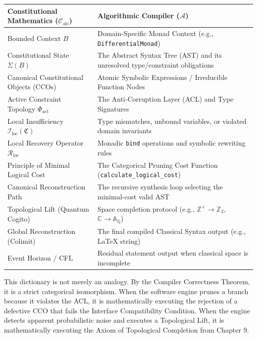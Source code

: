 \documentclass[12pt,openany]{extbook}
\theoremstyle{plain}
\theoremstyle{definition}
\begin{document}
\vspace{\intextsep}
\noindent
\begin{nopagebreak}
\renewcommand{\arraystretch}{1.5}
\begin{tabular}{p{} p{}}
\hline
\textbf{Constitutional Mathematics ($\mathcal{C}_{\mathrm{alc}}$)} & \textbf{Algorithmic Compiler ($\mathcal{A}$)} \\
\hline
Bounded Context $B$ & Domain-Specific Monad Context (e.g., \texttt{DifferentialMonad}) \\
\hline
Constitutional State $\Sigma(B)$ & The Abstract Syntax Tree (AST) and its unresolved type/constraint obligations \\
\hline
Canonical Constitutional Objects (CCOs) & Atomic Symbolic Expressions / Irreducible Function Nodes \\
\hline
Active Constraint Topology $\Phi_{\mathrm{act}}$ & The Anti-Corruption Layer (ACL) and Type Signatures \\
\hline
Local Insufficiency $\mathcal{I}_{\mathrm{loc}}(\mathfrak{C})$ & Type mismatches, unbound variables, or violated domain invariants \\
\hline
Local Recovery Operator $\mathcal{R}_{\mathrm{loc}}$ & Monadic \texttt{bind} operations and symbolic rewriting rules \\
\hline
Principle of Minimal Logical Cost & The Categorical Pruning Cost Function (\texttt{calculate\_logical\_cost}) \\
\hline
Canonical Reconstruction Path & The recursive synthesis loop selecting the minimal-cost valid AST \\
\hline
Topological Lift (Quantum Cogito) & Space completion protocol (e.g., $\mathbb{Z}^+ \to \mathbb{Z}_2$, $\mathbb{C} \to \mathbb{A}_{\mathbb{Q}}$) \\
\hline
Global Reconstruction (Colimit) & The final compiled Classical Syntax output (e.g., \LaTeX{} string) \\
\hline
Event Horizon / CFL & Residual statement output when classical space is incomplete \\
\hline
\end{tabular}
\end{nopagebreak}
\vspace{\intextsep}

This dictionary is not merely an analogy. By the Compiler Correctness Theorem, it is a strict categorical isomorphism. When the software engine prunes a branch because it violates the ACL, it is mathematically executing the rejection of a defective CCO that fails the Interface Compatibility Condition. When the engine detects apparent probabilistic noise and executes a Topological Lift, it is mathematically executing the Axiom of Topological Completion from Chapter 9.
\end{document}

